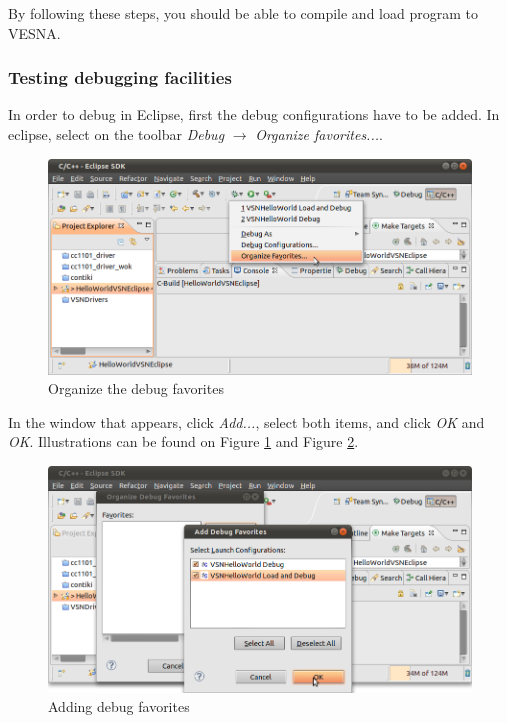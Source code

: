 \documentclass[a4paper, 10pt]{article}
\begin{document}

By following these steps, you should be able to compile and load program to VESNA.

\subsubsection{Testing debugging facilities}

In order to debug in Eclipse, first the debug configurations have to be added.
In eclipse, select on the toolbar \emph{Debug} $\rightarrow$ \emph{Organize favorites...}.

    \begin{figure}[H]
    \centering
        \includegraphics[width=\textwidth]{./install-guide-linux-images/debug-organize-fav.png}
        \caption{Organize the debug favorites}
        \label{fig:debug-org-fav}
    \end{figure}


In the window that appears, click \emph{Add...},
select both items, and click \emph{OK} and \emph{OK}. Illustrations can be found on
Figure \ref{fig:debug-org-fav} and Figure \ref{fig:debug-add-fav}.

    \begin{figure}[H]
    \centering
        \includegraphics[width=\textwidth]{./install-guide-linux-images/debug-add-fav.png}
        \caption{Adding debug favorites}
        \label{fig:debug-add-fav}
    \end{figure}
\end{document}

